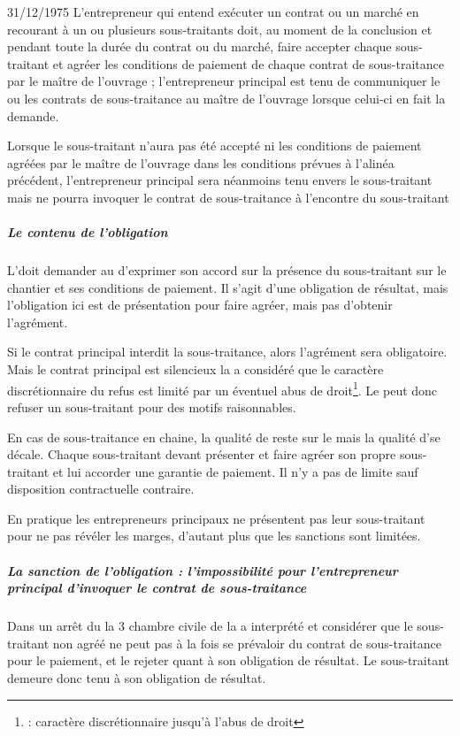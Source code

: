 				\begin{citationArticleLoi}[75-1334]{3}{31/12/1975}
					L'entrepreneur qui entend exécuter un contrat ou un marché en recourant à un ou plusieurs sous-traitants doit, au moment de la conclusion et pendant toute la durée du contrat ou du marché, faire accepter chaque sous-traitant et agréer les conditions de paiement de chaque contrat de sous-traitance par le maître de l'ouvrage ; l'entrepreneur principal est tenu de communiquer le ou les contrats de sous-traitance au maître de l'ouvrage lorsque celui-ci en fait la demande.

					Lorsque le sous-traitant n'aura pas été accepté ni les conditions de paiement agréées par le maître de l'ouvrage dans les conditions prévues à l'alinéa précédent, l'entrepreneur principal sera néanmoins tenu envers le sous-traitant mais ne pourra invoquer le contrat de sous-traitance à l'encontre du sous-traitant
				\end{citationArticleLoi}

				\subparagraph{Le contenu de l'obligation} L’\ep doit demander au \Mo d’exprimer son accord sur la présence du sous-traitant sur le chantier et ses conditions de paiement.
				Il s'agit d'une obligation de résultat, mais l’obligation ici est de présentation pour faire agréer, mais pas d’obtenir l'agrément.


				Si le contrat principal interdit la sous-traitance, alors l’agrément sera obligatoire. Mais le contrat principal est silencieux la \jp a considéré que le caractère discrétionnaire du refus est limité par un éventuel abus de droit\footnote{ : caractère discrétionnaire jusqu’à l’abus de droit}.
				Le \Mo peut donc refuser un sous-traitant pour des motifs raisonnables.


				En cas de sous-traitance en chaine, la qualité de \Mo reste sur le \Mo mais la qualité d'\ep se décale. Chaque sous-traitant devant présenter et faire agréer son propre sous-traitant et lui accorder une garantie de paiement.
				Il n’y a pas de limite sauf disposition contractuelle contraire.

				En pratique les entrepreneurs principaux ne présentent pas leur sous-traitant pour ne pas révéler les marges, d'autant plus que les sanctions sont limitées.


				\subparagraph{La sanction de l'obligation : l'impossibilité pour l'entrepreneur principal d'invoquer le contrat de sous-traitance}

					Dans un arrêt du  la 3\ieme{} chambre civile de la \CourDeCas a interprété et considérer que le sous-traitant non agréé ne peut pas à la fois se prévaloir du contrat de sous-traitance pour le paiement, et le rejeter quant à son obligation de résultat. Le sous-traitant demeure donc tenu à son obligation de résultat.

